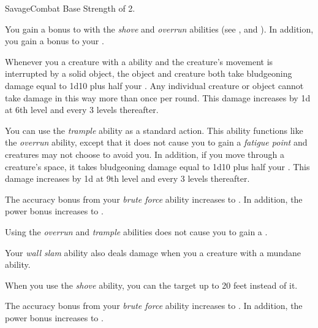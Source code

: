     \begin{feat}{Savage}{Combat}
        \featpre Base Strength of 2.

         You gain a  bonus to  with the \textit{shove} and \textit{overrun} abilities (see , and ).
        In addition, you gain a  bonus to your  .

         Whenever you  a creature with a  ability and the creature's movement is interrupted by a solid object, the object and creature both take bludgeoning damage equal to 1d10 plus half your .
        Any individual creature or object cannot take damage in this way more than once per round.
        This damage increases by \plus1d at 6th level and every 3 levels thereafter.

         You can use the \textit{trample} ability as a standard action.
        This ability functions like the \textit{overrun} ability, except that it does not cause you to gain a \textit{fatigue point} and creatures may not choose to avoid you.
        In addition, if you move through a creature's space, it takes bludgeoning damage equal to 1d10 plus half your .
        This damage increases by \plus1d at 9th level and every 3 levels thereafter.

         The accuracy bonus from your \textit{brute force} ability increases to .
        In addition, the power bonus increases to .

         Using the \textit{overrun} and \textit{trample} abilities does not cause you to gain a .

         Your \textit{wall slam} ability also deals damage when you  a creature with a mundane ability.

         When you use the \textit{shove} ability, you can  the target up to 20 feet instead of  it.

         The accuracy bonus from your \textit{brute force} ability increases to .
        In addition, the power bonus increases to .
    \end{feat}

